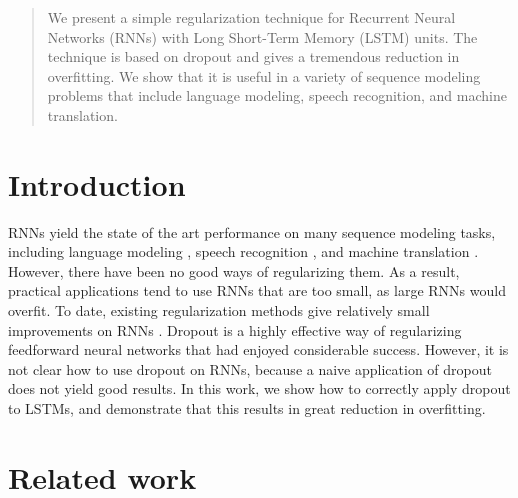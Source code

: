 \documentclass{article}
\begin{document}
 


\begin{abstract} 
  We present a simple regularization technique for Recurrent Neural
  Networks (RNNs) with Long Short-Term Memory (LSTM) units.  The
  technique is based on dropout and gives a tremendous reduction in
  overfitting.  We show that it is useful in a variety of sequence
  modeling problems that include language modeling, speech recognition, and
  machine translation.
\end{abstract} 

\section{Introduction}

RNNs yield the state of the art performance on many sequence modeling
tasks, including language modeling \cite{mikolov2012statistical}, speech recognition
\cite{graves2013speech}, and machine translation \cite{SVL2014, cho2014learning}.
However, there have been no good ways of regularizing them. As a
result, practical applications tend to use RNNs that are too small, as
large RNNs would overfit.  To date, existing regularization methods
give relatively small improvements on RNNs
\cite{graves2013generating}.  Dropout is a highly effective way of
regularizing feedforward neural networks
\cite{srivastava2013improving} that had enjoyed considerable
success. However, it is not clear how to use dropout on RNNs,
because a naive application of dropout does not yield good results.
In this work, we show how to correctly apply dropout to LSTMs, and
demonstrate that this results in great reduction in overfitting.

\section{Related work}
\end{document}
